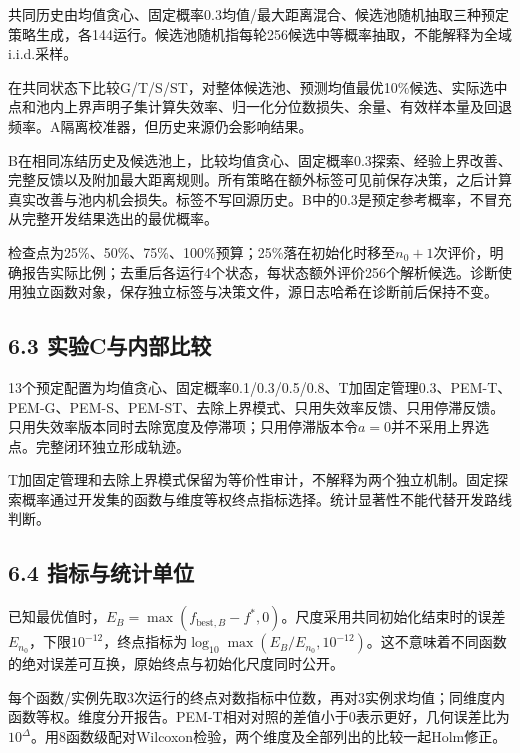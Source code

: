 \documentclass[11pt,a4paper]{article}
\begin{document}
共同历史由均值贪心、固定概率0.3均值/最大距离混合、候选池随机抽取三种预定策略生成，各144运行。候选池随机指每轮256候选中等概率抽取，不能解释为全域i.i.d.采样。

在共同状态下比较G/T/S/ST，对整体候选池、预测均值最优10\%候选、实际选中点和池内上界声明子集计算失效率、归一化分位数损失、余量、有效样本量及回退频率。A隔离校准器，但历史来源仍会影响结果。

B在相同冻结历史及候选池上，比较均值贪心、固定概率0.3探索、经验上界改善、完整反馈以及附加最大距离规则。所有策略在额外标签可见前保存决策，之后计算真实改善与池内机会损失。标签不写回源历史。B中的0.3是预定参考概率，不冒充从完整开发结果选出的最优概率。

检查点为25\%、50\%、75\%、100\%预算；25\%落在初始化时移至\(n_0+1\)次评价，明确报告实际比例；去重后各运行4个状态，每状态额外评价256个解析候选。诊断使用独立函数对象，保存独立标签与决策文件，源日志哈希在诊断前后保持不变。

\hypertarget{ux5b9eux9a8ccux4e0eux5185ux90e8ux6bd4ux8f83}{%
\subsection{6.3
实验C与内部比较}\label{ux5b9eux9a8ccux4e0eux5185ux90e8ux6bd4ux8f83}}

13个预定配置为均值贪心、固定概率0.1/0.3/0.5/0.8、T加固定管理0.3、PEM-T、PEM-G、PEM-S、PEM-ST、去除上界模式、只用失效率反馈、只用停滞反馈。只用失效率版本同时去除宽度及停滞项；只用停滞版本令\(a=0\)并不采用上界选点。完整闭环独立形成轨迹。

T加固定管理和去除上界模式保留为等价性审计，不解释为两个独立机制。固定探索概率通过开发集的函数与维度等权终点指标选择。统计显著性不能代替开发路线判断。

\hypertarget{ux6307ux6807ux4e0eux7edfux8ba1ux5355ux4f4d}{%
\subsection{6.4
指标与统计单位}\label{ux6307ux6807ux4e0eux7edfux8ba1ux5355ux4f4d}}

已知最优值时，\(E_B=\max(f_{\mathrm{best},B}-f^*,0)\)。尺度采用共同初始化结束时的误差\(E_{n_0}\)，下限\(10^{-12}\)，终点指标为\(\log_{10}\max(E_B/E_{n_0},10^{-12})\)。这不意味着不同函数的绝对误差可互换，原始终点与初始化尺度同时公开。

每个函数/实例先取3次运行的终点对数指标中位数，再对3实例求均值；同维度内函数等权。维度分开报告。PEM-T相对对照的差值小于0表示更好，几何误差比为\(10^\Delta\)。用8函数级配对Wilcoxon检验，两个维度及全部列出的比较一起Holm修正。
\end{document}
